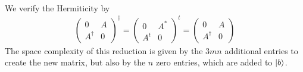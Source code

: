 \begin{enumerate}[label=\arabic*.]
\begin{align}
    \end{align}
    We verify the Hermiticity by
    \begin{align}
        \begin{pmatrix}
            0 & A\\
            A^\dagger & 0
        \end{pmatrix}^\dagger = \begin{pmatrix}
            0 & A^*\\
            A^t & 0
        \end{pmatrix}^t = \begin{pmatrix}
            0 & A\\
            A^\dagger & 0
        \end{pmatrix}
    \end{align}
    The space complexity of this reduction is given by the \(3mn\) additional entries to create the new matrix, but also by the \(n\) zero entries, which are added to \(\ket{b}\).

    \phantom{}


\end{enumerate}
